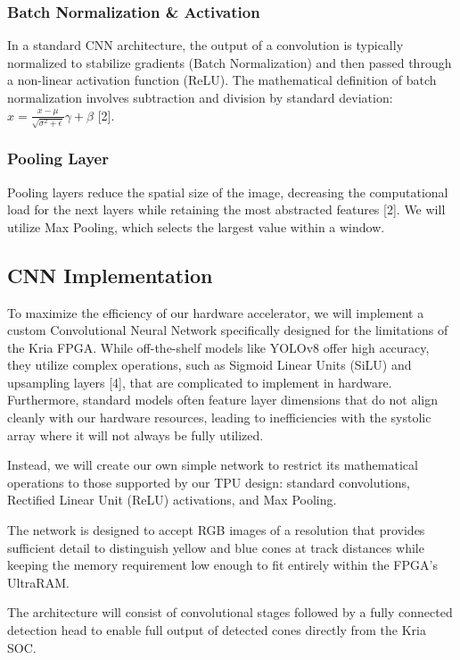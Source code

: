 \documentclass[11pt,a4paper,twoside]{article}
\begin{document}
\subsubsection{Batch Normalization \& Activation}
In a standard CNN architecture, the output of a convolution is typically normalized to stabilize gradients (Batch Normalization) and then passed through a non-linear activation function (ReLU). The mathematical definition of batch normalization involves subtraction and division by standard deviation: $\hat{x} = \frac{x - \mu}{\sqrt{\sigma^2 + \epsilon}}\gamma + \beta$ [2].

\subsubsection{Pooling Layer}
Pooling layers reduce the spatial size of the image, decreasing the computational load for the next layers while retaining the most abstracted features [2]. We will utilize Max Pooling, which selects the largest value within a window.

\subsection{CNN Implementation}

To maximize the efficiency of our hardware accelerator, we will implement a custom Convolutional Neural Network specifically designed for the limitations of the Kria FPGA. While off-the-shelf models like YOLOv8 offer high accuracy, they utilize complex operations, such as Sigmoid Linear Units (SiLU) and upsampling layers [4], that are complicated to implement in hardware. Furthermore, standard models often feature layer dimensions that do not align cleanly with our hardware resources, leading to inefficiencies with the systolic array where it will not always be fully utilized.

Instead, we will create our own simple network to restrict its mathematical operations to those supported by our TPU design: standard convolutions, Rectified Linear Unit (ReLU) activations, and Max Pooling.

The network is designed to accept RGB images of a resolution that provides sufficient detail to distinguish yellow and blue cones at track distances while keeping the memory requirement low enough to fit entirely within the FPGA's UltraRAM.

The architecture will consist of convolutional stages followed by a fully connected detection head to enable full output of detected cones directly from the Kria SOC.
\end{document}
